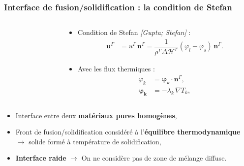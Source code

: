 \documentclass{beamer}
\newcommand{\inte}{\Gamma}
\newcommand{\vect}[1]{\bm{#1}}
\newcommand{\bib}[1]{{\color{cea_texte!80}\tiny\textit{[#1]}}}
\renewcommand{\frac}{\dfrac}
\newcommand{\Frac}{\displaystyle\frac}
\begin{document}
\begin{frame}
    \frametitle{Interface de fusion/solidification : la condition de Stefan}
    \footnotesize
    \begin{columns}[c]
        \begin{column}{0.4\textwidth}
		\begin{tikzpicture}[scale = 0.4, every node/.style={scale=0.4}]
        
		\end{tikzpicture} 
        \end{column}
\footnotesize
	\begin{column}{0.6\textwidth}
			\begin{itemize}
				\item  Condition de Stefan \bib{Gupta; Stefan} :
						\begin{align} \label{eq:Stefan_cond}
						\vect{u}^\inte &= u^\inte \, \vect{n}^\Gamma = \Frac{1}{\rho^{\Gamma} \Delta \mathcal{H}^{\Gamma}} (\varphi_l - \varphi_s) \, \vect{n}^\Gamma.
						\end{align}
				\item Avec les flux thermiques :
						\begin{align} \label{eq:heat_flux}
						\varphi_k&=\vect{\varphi}_k\cdot\vect{n}^\Gamma,\\
						\vect{\varphi_k} &= -\lambda_k \, \nabla T_k,
						\end{align}
			\end{itemize}
        \end{column}
\normalsize
	\end{columns}
	
\begin{itemize}
	\item Interface entre deux \textbf{matériaux pures homogènes},
	\item Front de fusion/solidification considéré à l'\textbf{équilibre thermodynamique} $\rightarrow$ solide formé à température de solidification,
	\item  \textbf{Interface raide}   $\rightarrow$  On ne considère pas de zone de mélange diffuse.
\end{itemize}

\end{frame}
\end{document}
